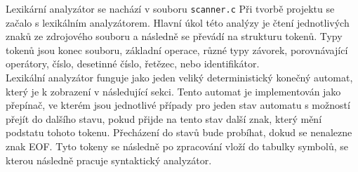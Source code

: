 \documentclass[../main.tex]{subfiles}
\begin{document}
Lexikární analyzátor se nachází v souboru \texttt{scanner.c}
Při tvorbě projektu se začalo s lexikálním analyzátorem. Hlavní úkol této analýzy je čtení jednotlivých znaků ze zdrojového souboru a následně se převádí na strukturu tokenů. Typy tokenů jsou konec souboru, základní operace, různé typy závorek, porovnávající operátory, číslo, desetinné číslo, řetězec, nebo identifikátor.\\
Lexikální analyzátor funguje jako jeden veliký deterministický konečný automat, který je k zobrazení v následující sekci. Tento automat je implementován jako přepínač, ve kterém jsou jednotlivé případy pro jeden stav automatu s možností přejít do dalšího stavu, pokud přijde na tento stav další znak, který mění podstatu tohoto tokenu. Přecházení do stavů bude probíhat, dokud se nenalezne znak EOF. Tyto tokeny se následně po zpracování vloží do tabulky symbolů, se kterou následně pracuje syntaktický analyzátor.
\end{document}
